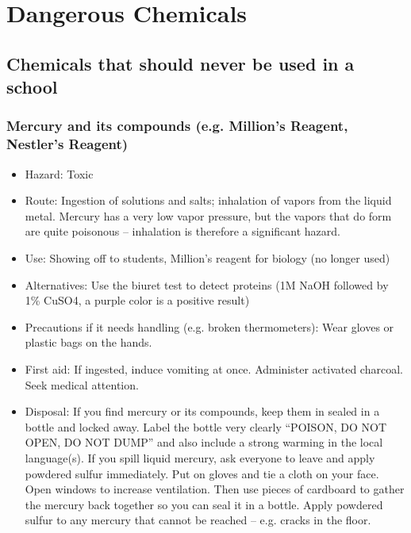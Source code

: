 \chapter{Dangerous Chemicals}

\section{Chemicals that should never be used in a school}

\subsection{Mercury and its compounds 
(e.g. Million's Reagent, Nestler's Reagent)}

\begin{itemize}

\item{Hazard: Toxic}

\item{Route: Ingestion of solutions and salts; 
inhalation of vapors from the liquid metal. 
Mercury has a very low vapor pressure, 
but the vapors that do form are quite poisonous – 
inhalation is therefore a significant hazard.}

\item{Use: Showing off to students, 
Million's reagent for biology (no longer used)}

\item{Alternatives: Use the biuret test to detect proteins 
(1M NaOH followed by 1\% CuSO4, a purple color is a positive result)}

\item{Precautions if it needs handling (e.g. broken thermometers): 
Wear gloves or plastic bags on the hands.}

\item{First aid: If ingested, induce vomiting at once. 
Administer activated charcoal. Seek medical attention.}

\item{Disposal: If you find mercury or its compounds, 
keep them in sealed in a bottle and locked away. 
Label the bottle very clearly “POISON, DO NOT OPEN, DO NOT DUMP” 
and also include a strong warming in the local language(s). 
If you spill liquid mercury, 
ask everyone to leave and apply powdered sulfur immediately. 
Put on gloves and tie a cloth on your face. 
Open windows to increase ventilation. 
Then use pieces of cardboard to gather the mercury back together 
so you can seal it in a bottle. 
Apply powdered sulfur to any mercury that cannot be reached – 
e.g. cracks in the floor.}

\end{itemize}

